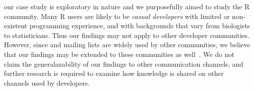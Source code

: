 \begin{description}[itemsep=3pt, topsep=2pt, leftmargin=1em, parsep=0pt]

\item[External validity:] our case study is exploratory in nature and we purposefully aimed to study the R community. Many R users are likely to be \textit{casual developers} with limited or non-existent programming experience, and with backgrounds that vary from biologists to statisticians. Thus our findings may not apply to other developer communities. However, since \SO and mailing lists are widely used by other communities, we believe that our findings may be extended to these communities as well~\cite{Squire2015a}. We do not claim the generalazability of our findings to other communication channels, and further research is required to examine how knowledge is shared on other channels used by developers.

\end{description}

